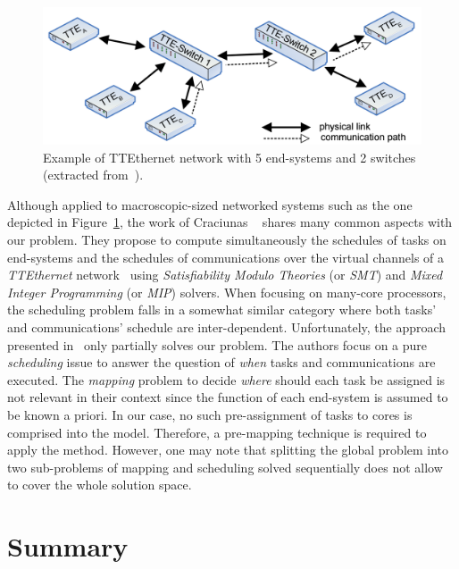 \documentclass[main.tex]{subfiles}
\begin{document}
\begin{figure}
    \centering
    \includegraphics[width=12cm]{imgs/png/stateOfTheArt_2_TTEthernetNetwork.png}
    \caption{Example of TTEthernet network with 5 end-systems and 2 switches
    (extracted from~\cite{Craciunas2016}).}
    \label{fig_stateOfTheArt_2_TTEthernetNetwork}
\end{figure}
Although applied to macroscopic-sized networked systems such as the one
depicted in Figure~\ref{fig_stateOfTheArt_2_TTEthernetNetwork}, the work of
Craciunas \etal~\cite{Craciunas2016} shares many common aspects with our
problem. They propose to compute simultaneously the schedules of tasks on
end-systems and the schedules of communications over the virtual channels of a
\emph{TTEthernet} network~\cite{ttethernet} using \emph{Satisfiability Modulo
Theories} (or \emph{SMT}) and \emph{Mixed Integer Programming} (or \emph{MIP})
solvers. When focusing on many-core processors, the scheduling problem falls in
a somewhat similar category where both tasks' and communications' schedule are
inter-dependent. Unfortunately, the approach presented in~\cite{Craciunas2016}
only partially solves our problem. The authors focus on a pure
\emph{scheduling} issue to answer the question of \emph{when} tasks and
communications are executed. The \emph{mapping} problem to decide \emph{where}
should each task be assigned is not relevant in their context since the
function of each end-system is assumed to be known a priori. In our case, no
such pre-assignment of tasks to cores is comprised into the model. Therefore, a
pre-mapping technique is required to apply the method. However, one may note
that splitting the global problem into two sub-problems of mapping and
scheduling solved sequentially does not allow to cover the whole solution
space. 

\section{Summary}
\end{document}
